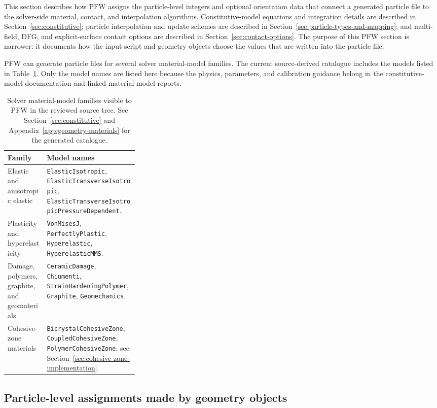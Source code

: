 This section describes how PFW assigns the particle-level integers and optional orientation data that connect a generated particle file to the solver-side material, contact, and interpolation algorithms.  Constitutive-model equations and integration details are described in Section~\ref{sec:constitutive}; particle interpolation and update schemes are described in Section~\ref{sec:particle-types-and-mapping}; and multi-field, DFG, and explicit-surface contact options are described in Section~\ref{sec:contact-options}.  The purpose of this PFW section is narrower: it documents how the input script and geometry objects choose the values that are written into the particle file.

PFW can generate particle files for several solver material-model families.  The current source-derived catalogue includes the models listed in Table~\ref{tab:pfw-material-model-list}.  Only the model names are listed here because the physics, parameters, and calibration guidance belong in the constitutive-model documentation and linked material-model reports.

\begin{table}[htbp]
\centering
\caption{Solver material-model families visible to PFW in the reviewed source tree.  See Section~\ref{sec:constitutive} and Appendix~\ref{app:geometry-materials} for the generated catalogue.}
\label{tab:pfw-material-model-list}
\small
\begin{tabularx}{\linewidth}{@{}p{0.30\linewidth}X@{}}
\toprule
\textbf{Family} & \textbf{Model names}\\
\midrule
Elastic and anisotropic elastic & \texttt{ElasticIsotropic}, \texttt{ElasticTransverseIsotropic}, \texttt{ElasticTransverseIsotropicPressureDependent}.\\
Plasticity and hyperelasticity & \texttt{VonMisesJ}, \texttt{PerfectlyPlastic}, \texttt{Hyperelastic}, \texttt{HyperelasticMMS}.\\
Damage, polymers, graphite, and geomaterials & \texttt{CeramicDamage}, \texttt{Chiumenti}, \texttt{StrainHardeningPolymer}, \texttt{Graphite}, \texttt{Geomechanics}.\\
Cohesive-zone materials & \texttt{BicrystalCohesiveZone}, \texttt{CoupledCohesiveZone}, \texttt{PolymerCohesiveZone}; see Section~\ref{sec:cohesive-zone-implementation}.\\
\bottomrule
\end{tabularx}
\end{table}

\subsection{Particle-level assignments made by geometry objects}
\label{subsec:pfw-material-group-type-assignment}


